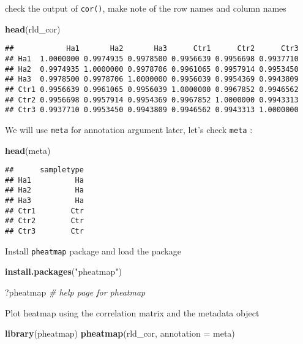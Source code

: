 \documentclass[
]{article}
\newenvironment{Shaded}{\begin{snugshade}}{\end{snugshade}}
\newcommand{\AttributeTok}[1]{\textcolor[rgb]{0.13,0.29,0.53}{#1}}
\newcommand{\CommentTok}[1]{\textcolor[rgb]{0.56,0.35,0.01}{\textit{#1}}}
\newcommand{\FunctionTok}[1]{\textcolor[rgb]{0.13,0.29,0.53}{\textbf{#1}}}
\newcommand{\NormalTok}[1]{#1}
\newcommand{\StringTok}[1]{\textcolor[rgb]{0.31,0.60,0.02}{#1}}
\begin{document}
check the output of \texttt{cor()}, make note of the row names and
column names

\begin{Shaded}
\begin{Highlighting}[]
\FunctionTok{head}\NormalTok{(rld\_cor)}
\end{Highlighting}
\end{Shaded}

\begin{verbatim}
##            Ha1       Ha2       Ha3      Ctr1      Ctr2      Ctr3
## Ha1  1.0000000 0.9974935 0.9978500 0.9956639 0.9956698 0.9937710
## Ha2  0.9974935 1.0000000 0.9978706 0.9961065 0.9957914 0.9953450
## Ha3  0.9978500 0.9978706 1.0000000 0.9956039 0.9954369 0.9943809
## Ctr1 0.9956639 0.9961065 0.9956039 1.0000000 0.9967852 0.9946562
## Ctr2 0.9956698 0.9957914 0.9954369 0.9967852 1.0000000 0.9943313
## Ctr3 0.9937710 0.9953450 0.9943809 0.9946562 0.9943313 1.0000000
\end{verbatim}

We will use \texttt{meta} for annotation argument later, let's check
\texttt{meta} :

\begin{Shaded}
\begin{Highlighting}[]
\FunctionTok{head}\NormalTok{(meta)}
\end{Highlighting}
\end{Shaded}

\begin{verbatim}
##      sampletype
## Ha1          Ha
## Ha2          Ha
## Ha3          Ha
## Ctr1        Ctr
## Ctr2        Ctr
## Ctr3        Ctr
\end{verbatim}

Install \texttt{pheatmap} package and load the package

\begin{Shaded}
\begin{Highlighting}[]
\FunctionTok{install.packages}\NormalTok{(}\StringTok{"pheatmap"}\NormalTok{)}

\NormalTok{?pheatmap }\CommentTok{\# help page for pheatmap}
\end{Highlighting}
\end{Shaded}

Plot heatmap using the correlation matrix and the metadata object

\begin{Shaded}
\begin{Highlighting}[]
\FunctionTok{library}\NormalTok{(pheatmap)}
\FunctionTok{pheatmap}\NormalTok{(rld\_cor, }\AttributeTok{annotation =}\NormalTok{ meta)}
\end{Highlighting}
\end{Shaded}
\end{document}
